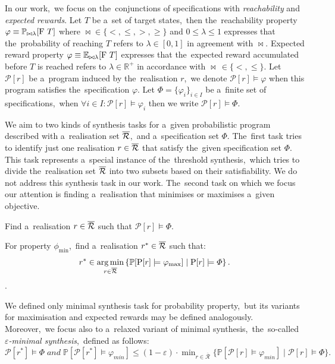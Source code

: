 \begin{definition}[Specification]
In our work,~we focus on the~conjunctions of specifications with \textit{reachability} and \textit{expected rewards}.
Let $T$ be a~set of target states,~then the~reachability property $\varphi \equiv \mathbb{P}_{\bowtie \lambda}[\mathrm{F}\ T]$ where $\bowtie \in \{<, \leq, >, \geq\}$ and $0 \leq \lambda \leq 1$ expresses that the~probability of reaching $T$ refers to $\lambda \in [0,1]$ in agreement with $\bowtie$.
Expected reward property $\varphi \equiv \mathbb{E}_{\bowtie \lambda}[\mathrm{F}\ T]$ expresses that the~expected reward accumulated before $T$ is reached refers to $\lambda \in \mathbb{R}^+$ in accordance with $\bowtie \, \in \{<, \leq \}$.
Let $\mathcal{P}[r]$ be a~program induced by the~realisation $r$,~we denote $\mathcal{P}[r] \models \varphi$ when this program satisfies the~specification $\varphi$.
Let $\varPhi = \{ \varphi_i \}_{i \in I}$ be a~finite set of specifications,~when $\forall i \in I: \mathcal{P}[r] \models \varphi_i$ then we write $\mathcal{P}[r] \models \varPhi$.
\end{definition}

We aim to two kinds of synthesis tasks for a~given probabilistic program described with a~realisation set $\overline{\mathcal{R}}$,~and a~specification set $\varPhi$.
The~first task tries to identify just one realisation $r \in \overline{\mathcal{R}}$ that satisfy the~given specification set $\varPhi$.
This task represents a~special instance of the~threshold synthesis,~which tries to divide the~realisation set $\overline{\mathcal{R}}$ into two subsets based on their satisfiability.
We do not address this synthesis task in our work.
The~second task on which we focus our attention is finding a~realisation that minimises or maximises a~given objective.

\begin{definition}[Feasibility]
Find a~realisation $r \in \overline{\mathcal{R}}$ such that $\mathcal{P}[r] \models \varPhi$. 
\end{definition}

\begin{definition}[Minimality] \label{def:minimality}
For property $\phi_{\min}$,~find a~realisation $r^* \in \overline{\mathcal{R}}$ such that:
$$r^* \in \operatorname*{arg\,min}_{r \in \overline{\mathcal{R}}} \left \{ \mathbb{P}[\mathrm{P}[r] \models \varphi_{\max}] \mid \mathrm{P}[r] \models \varPhi \right \}.$$.
\end{definition}

We defined only minimal synthesis task for probability property,~but its variants for maximisation and expected rewards may be defined analogously.
Moreover,~we focus also to a~relaxed variant of minimal synthesis,~the~so-called \textit{$\varepsilon$-minimal synthesis},~defined as follows: $\mathcal{P}[r^*] \models \varPhi \; and \; 
\mathbb{P}[\mathcal{P}[r^*] \models \varphi_{min}] \leq (1 - \varepsilon) \cdot \min_{r \in \mathcal{\overline{R}}} \{ \mathbb{P}[\mathcal{P}[r] \models \varphi_{min}] \; \lvert \; \mathcal{P}[r] \models \varPhi \}.$

